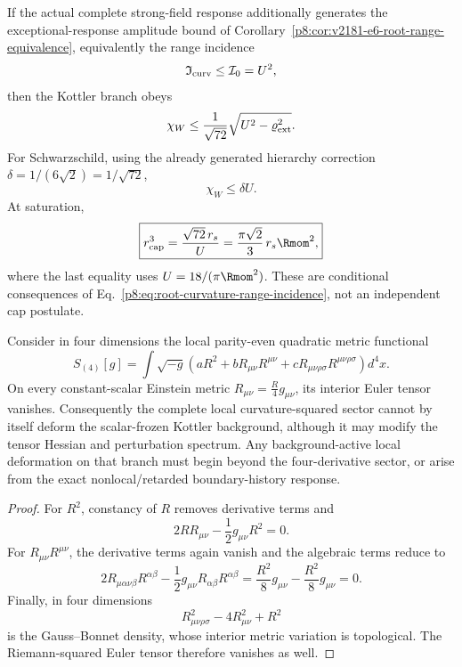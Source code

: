 \documentclass[12pt,a4paper]{article}
\begin{document}
\begin{corollary}
\label{p8:cor:conditional-root-curvature-range}
If the actual complete strong-field response additionally generates the
exceptional-response amplitude bound of
Corollary~\ref{p8:cor:v2181-e6-root-range-equivalence}, equivalently the range
incidence
\begin{equation}
\label{p8:eq:root-curvature-range-incidence}
 \mathfrak I_{\rm curv}\le\mathcal I_0=U^2,
\end{equation}
then the Kottler branch obeys
\[
 \chi_W\le\frac1{\sqrt{72}}
 \sqrt{U^2-\varrho_{\rm ext}^2}.
\]
For Schwarzschild, using the already generated hierarchy correction
\(\delta=1/(6\sqrt2)=1/\sqrt{72}\),
\begin{equation}
\label{p8:eq:conditional-schwarzschild-root-cap}
 \boxed{\chi_W\le\delta U.}
\end{equation}
At saturation,
\begin{equation}
\label{p8:eq:conditional-schwarzschild-cap-radius}
 \boxed{r_{\rm cap}^3=\frac{\sqrt{72}\,r_s}{U}
 =\frac{\pi\sqrt2}{3}\,r_s\Rmom^2,}
\end{equation}
where the last equality uses \(U=18/(\pi\Rmom^2)\).  These are conditional
consequences of Eq.~\eqref{p8:eq:root-curvature-range-incidence}, not an
independent cap postulate.
\end{corollary}

\begin{proposition}
\label{p8:prop:quadratic-curvature-kottler-no-go}
Consider in four dimensions the local parity-even quadratic metric functional
\[
 S_{(4)}[g]=\int\sqrt{-g}
 \left(aR^2+bR_{\mu\nu}R^{\mu\nu}
 +cR_{\mu\nu\rho\sigma}R^{\mu\nu\rho\sigma}\right)d^4x.
\]
On every constant-scalar Einstein metric
\(R_{\mu\nu}=\frac R4g_{\mu\nu}\), its interior Euler tensor vanishes.
Consequently the complete local curvature-squared sector cannot by itself
deform the scalar-frozen Kottler background, although it may modify the tensor
Hessian and perturbation spectrum.  Any background-active local deformation on
that branch must begin beyond the four-derivative sector, or arise from the
exact nonlocal/retarded boundary-history response.
\end{proposition}

\begin{proof}
For \(R^2\), constancy of \(R\) removes derivative terms and
\[
 2RR_{\mu\nu}-\frac12g_{\mu\nu}R^2=0.
\]
For \(R_{\mu\nu}R^{\mu\nu}\), the derivative terms again vanish and the
algebraic terms reduce to
\[
 2R_{\mu\alpha\nu\beta}R^{\alpha\beta}
 -\frac12g_{\mu\nu}R_{\alpha\beta}R^{\alpha\beta}
 =\frac{R^2}{8}g_{\mu\nu}-\frac{R^2}{8}g_{\mu\nu}=0.
\]
Finally, in four dimensions
\[
 R_{\mu\nu\rho\sigma}^2-4R_{\mu\nu}^2+R^2
\]
is the Gauss--Bonnet density, whose interior metric variation is topological.
The Riemann-squared Euler tensor therefore vanishes as well.
\end{proof}
\end{document}

